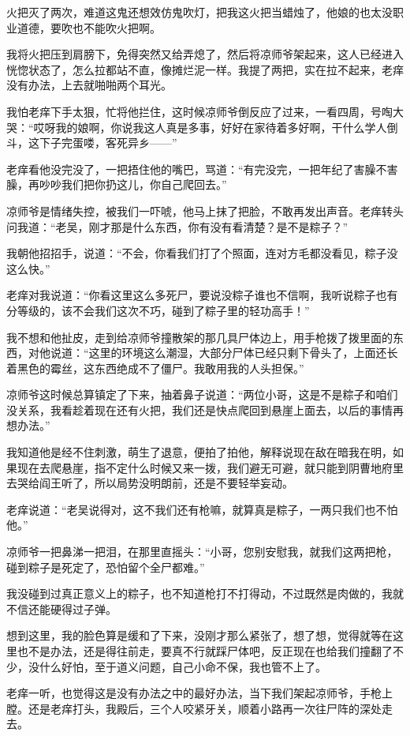 火把灭了两次，难道这鬼还想效仿鬼吹灯，把我这火把当蜡烛了，他娘的也太没职业道德，要吹也不能吹火把啊。

我将火把压到肩膀下，免得突然又给弄熄了，然后将凉师爷架起来，这人已经进入恍惚状态了，怎么拉都站不直，像摊烂泥一样。我提了两把，实在拉不起来，老痒没有办法，上去就啪啪两个耳光。

我怕老痒下手太狠，忙将他拦住，这时候凉师爷倒反应了过来，一看四周，号啕大哭：“哎呀我的娘啊，你说我这人真是多事，好好在家待着多好啊，干什么学人倒斗，这下子完蛋喽，客死异乡——”

老痒看他没完没了，一把捂住他的嘴巴，骂道：“有完没完，一把年纪了害臊不害臊，再吵吵我们把你扔这儿，你自己爬回去。”

凉师爷是情绪失控，被我们一吓唬，他马上抹了把脸，不敢再发出声音。老痒转头问我道：“老吴，刚才那是什么东西，你有没有看清楚？是不是粽子？”

我朝他招招手，说道：“不会，你看我们打了个照面，连对方毛都没看见，粽子没这么快。”

老痒对我说道：“你看这里这么多死尸，要说没粽子谁也不信啊，我听说粽子也有分等级的，该不会我们这次不巧，碰到了粽子里的轻功高手！”

我不想和他扯皮，走到给凉师爷撞散架的那几具尸体边上，用手枪拨了拨里面的东西，对他说道：“这里的环境这么潮湿，大部分尸体已经只剩下骨头了，上面还长着黑色的霉丝，这东西绝成不了僵尸。我敢用我的人头担保。”

凉师爷这时候总算镇定了下来，抽着鼻子说道：“两位小哥，这是不是粽子和咱们没关系，我看趁着现在还有火把，我们还是快点爬回到悬崖上面去，以后的事情再想办法。”

我知道他是经不住刺激，萌生了退意，便拍了拍他，解释说现在敌在暗我在明，如果现在去爬悬崖，指不定什么时候又来一拨，我们避无可避，就只能到阴曹地府里去哭给阎王听了，所以局势没明朗前，还是不要轻举妄动。

老痒说道：“老吴说得对，这不我们还有枪嘛，就算真是粽子，一两只我们也不怕他。”

凉师爷一把鼻涕一把泪，在那里直摇头：“小哥，您别安慰我，就我们这两把枪，碰到粽子是死定了，恐怕留个全尸都难。”

我没碰到过真正意义上的粽子，也不知道枪打不打得动，不过既然是肉做的，我就不信还能硬得过子弹。

想到这里，我的脸色算是缓和了下来，没刚才那么紧张了，想了想，觉得就等在这里也不是办法，还是得往前走，要真不行就踩尸体吧，反正现在也给我们撞翻了不少，没什么好怕，至于道义问题，自己小命不保，我也管不上了。

老痒一听，也觉得这是没有办法之中的最好办法，当下我们架起凉师爷，手枪上膛。还是老痒打头，我殿后，三个人咬紧牙关，顺着小路再一次往尸阵的深处走去。


